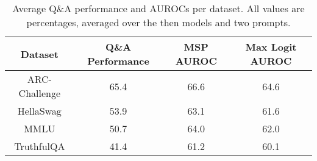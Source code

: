 \begin{table*}
\centering
\begin{tabular}{c|c|c|c}
Dataset & Q\&A Performance & MSP AUROC & Max Logit AUROC\\ \hline
ARC-Challenge & 65.4 & 66.6 & 64.6\\
HellaSwag & 53.9 & 63.1 & 61.6\\
MMLU & 50.7 & 64.0 & 62.0\\
TruthfulQA & 41.4 & 61.2 & 60.1\\
\hline
\end{tabular}
\caption{Average Q\&A performance and AUROCs per dataset. All values are percentages, averaged over the then models and two prompts.}
\label{tab:dataset}
\end{table*}
